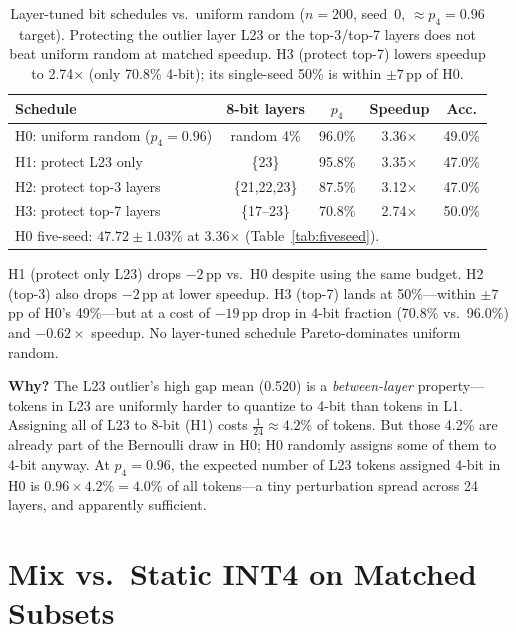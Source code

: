 \documentclass{article}
\begin{document}
\begin{table}[h]
\centering
\caption{Layer-tuned bit schedules vs.\ uniform random ($n{=}200$, seed~0,
$\approx p_4{=}0.96$ target). Protecting the outlier layer L23 or the top-3/top-7 layers
does not beat uniform random at matched speedup. H3 (protect top-7) lowers speedup to
2.74$\times$ (only 70.8\% 4-bit); its single-seed 50\% is within $\pm7$\,pp of H0.}
\begin{tabular}{lcccc}
\toprule
Schedule & 8-bit layers & $p_4$ & Speedup & Acc. \\
\midrule
H0: uniform random ($p_4{=}0.96$) & random 4\% & 96.0\% & 3.36$\times$ & 49.0\% \\
H1: protect L23 only              & \{23\}       & 95.8\% & 3.35$\times$ & 47.0\% \\
H2: protect top-3 layers          & \{21,22,23\} & 87.5\% & 3.12$\times$ & 47.0\% \\
H3: protect top-7 layers          & \{17--23\}   & 70.8\% & 2.74$\times$ & 50.0\% \\
\midrule
\multicolumn{5}{l}{\small H0 five-seed: $47.72\pm1.03$\% at 3.36$\times$ (Table~\ref{tab:fiveseed}).} \\
\bottomrule
\end{tabular}
\label{tab:layer_schedules}
\end{table}

H1 (protect only L23) drops $-2$\,pp vs.\ H0 despite using the same budget. H2 (top-3) also
drops $-2$\,pp at lower speedup. H3 (top-7) lands at 50\%---within $\pm7$\,pp of H0's
49\%---but at a cost of $-19$\,pp drop in 4-bit fraction (70.8\% vs.\ 96.0\%) and $-0.62\times$
speedup. No layer-tuned schedule Pareto-dominates uniform random.

\textbf{Why?} The L23 outlier's high gap mean (0.520) is a \emph{between-layer} property---tokens
in L23 are uniformly harder to quantize to 4-bit than tokens in L1. Assigning all of L23 to
8-bit (H1) costs $\frac{1}{24}\approx4.2\%$ of tokens. But those 4.2\% are already part of
the Bernoulli draw in H0; H0 randomly assigns some of them to 4-bit anyway. At $p_4{=}0.96$,
the expected number of L23 tokens assigned 4-bit in H0 is $0.96\times 4.2\% = 4.0\%$ of all
tokens---a tiny perturbation spread across 24 layers, and apparently sufficient.

\section{Mix vs.\ Static INT4 on Matched Subsets}
\label{sec:matched}
\end{document}
